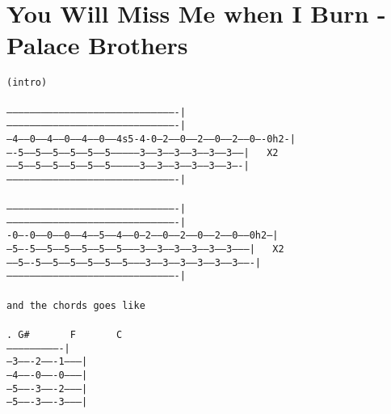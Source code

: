 \newpage
\section{You Will Miss Me when I Burn - Palace Brothers}
\label{You Will Miss Me when I Burn - Palace Brothers}
\texttt{(intro)\\
\\
----------------------------------------------------------------------------------------|\\
----------------------------------------------------------------------------------------|\\
--4-----0-----4-----0-----4------0-----4s5-4-0---2-----0-----2-----0-----2-----0----0h2-|\\
----5-----5-----5-----5-----5------5---------------3-----3-----3-----3-----3-----3------|\ \ \ X2\\
------5-----5-----5-----5-----5------5---------------3-----3-----3-----3-----3-----3----|\\
----------------------------------------------------------------------------------------|\\
\\
----------------------------------------------------------------------------------------|\\
----------------------------------------------------------------------------------------|\\
-0----0-----0-----0-----4-----5-----4-----0---2-----0-----2-----0-----2-----0-----0h2---|\\
---5----5-----5-----5-----5-----5-----5---------3-----3-----3-----3-----3-----3---------|\ \ \ X2\\
-----5----5-----5-----5-----5-----5-----5---------3-----3-----3-----3-----3-----3-------|\\
----------------------------------------------------------------------------------------|\\
\\
and\ the\ chords\ goes\ like\\
\\
.\ G\#\ \ \ \ \ \ \ F\ \ \ \ \ \ \ C\\
----------------------------|\\
---3-------2-------1--------|\\
---4-------0-------0--------|\\
---5-------3-------2--------|\\
---5-------3-------3--------|\\
}
